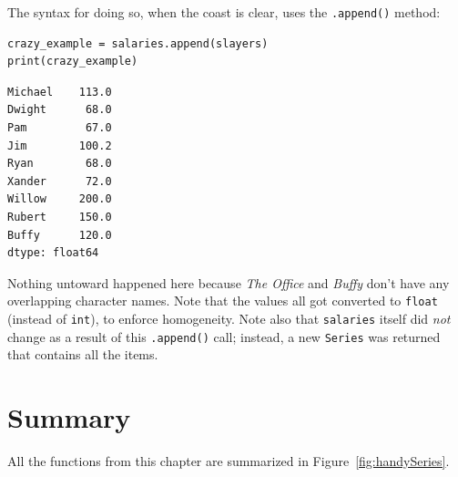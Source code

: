 The syntax for doing so, when the coast is clear, uses the \texttt{.append()}
method:

\begin{Verbatim}[fontsize=\small,samepage=true,frame=single,framesep=3mm]
crazy_example = salaries.append(slayers)
print(crazy_example)
\end{Verbatim}
\vspace{-.3in}

\begin{Verbatim}[fontsize=\small,samepage=true,frame=leftline,framesep=5mm,framerule=1mm]
Michael    113.0
Dwight      68.0
Pam         67.0
Jim        100.2
Ryan        68.0
Xander      72.0
Willow     200.0
Rubert     150.0
Buffy      120.0
dtype: float64
\end{Verbatim}

Nothing untoward happened here because \textit{The Office} and \textit{Buffy}
don't have any overlapping character names. Note that the values all got
converted to \texttt{float} (instead of \texttt{int}), to enforce homogeneity.
Note also that \texttt{salaries} itself did \textit{not} change as a result of
this \texttt{.append()} call; instead, a new \texttt{Series} was returned that
contains all the items.


\section{Summary}

All the functions from this chapter are summarized in
Figure~\ref{fig:handySeries}.

\setlength\extrarowheight{5pt}

